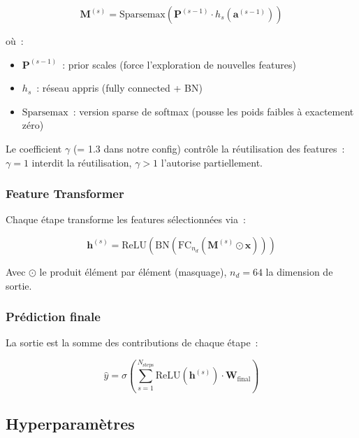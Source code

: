 \documentclass[12pt,a4paper]{article}
\begin{document}
\begin{equation}
    \mathbf{M}^{(s)} = \text{Sparsemax}\left(\mathbf{P}^{(s-1)} \cdot h_s\left(\mathbf{a}^{(s-1)}\right)\right)
    \label{eq:attention}
\end{equation}

o\`u~:
\begin{itemize}[noitemsep]
    \item $\mathbf{P}^{(s-1)}$~: prior scales (force l'exploration de nouvelles features)
    \item $h_s$~: r\'eseau appris (fully connected + BN)
    \item $\text{Sparsemax}$~: version sparse de softmax (pousse les poids faibles \`a exactement z\'ero)
\end{itemize}

Le coefficient $\gamma$ (= 1.3 dans notre config) contr\^ole la r\'eutilisation des features~: $\gamma = 1$ interdit la r\'eutilisation, $\gamma > 1$ l'autorise partiellement.

\subsubsection{Feature Transformer}

Chaque \'etape transforme les features s\'electionn\'ees via~:

\begin{equation}
    \mathbf{h}^{(s)} = \text{ReLU}\left(\text{BN}\left(\text{FC}_{n_d}\left(\mathbf{M}^{(s)} \odot \mathbf{x}\right)\right)\right)
    \label{eq:ft}
\end{equation}

Avec $\odot$ le produit \'el\'ement par \'el\'ement (masquage), $n_d = 64$ la dimension de sortie.

\subsubsection{Pr\'ediction finale}

La sortie est la somme des contributions de chaque \'etape~:

\begin{equation}
    \hat{y} = \sigma\left(\sum_{s=1}^{N_{\text{steps}}} \text{ReLU}\left(\mathbf{h}^{(s)}\right) \cdot \mathbf{W}_{\text{final}}\right)
    \label{eq:tabnet_pred}
\end{equation}

\subsection{Hyperparamètres}
\end{document}
